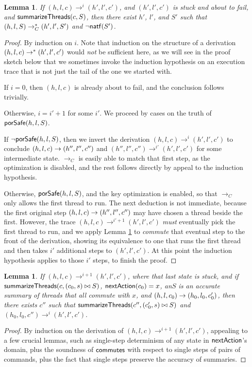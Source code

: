 \documentclass{amsbook}
\newtheorem{lemma}[theorem]{Lemma}
\theoremstyle{definition}
\theoremstyle{remark}
\numberwithin{section}{chapter}
\numberwithin{equation}{chapter}
\begin{document}
\begin{lemma}\label{translate_trace}
  If $(h, l, c) \to^i (h', l', c')$, and $(h', l', c')$ is stuck and about to fail, and $\mathsf{summarizeThreads}(c, S)$, then there exist $h'$, $l'$, and $S'$ such that $(h, l, S) \to_C^* (h', l', S')$ and $\neg \mathsf{natf}(S')$.
\end{lemma}
\begin{proof}
  By induction on $i$.
  Note that induction on the structure of a derivation $(h, l, c) \to^* (h', l', c')$ would \emph{not} be sufficient here, as we will see in the proof sketch below that we sometimes invoke the induction hypothesis on an execution trace that is not just the tail of the one we started with.

  If $i = 0$, then $(h, l, c)$ is already about to fail, and the conclusion follows trivially.

  Otherwise, $i = i' + 1$ for some $i'$.
  We proceed by cases on the truth of $\mathsf{porSafe}(h, l, S)$.

  If $\neg \mathsf{porSafe}(h, l, S)$, then we invert the derivation $(h, l, c) \to^i (h', l', c')$ to conclude $(h, l, c) \to (h'', l'', c'')$ and $(h'', l'', c'') \to^{i'} (h', l', c')$ for some intermediate state.
  $\to_C$ is easily able to match that first step, as the optimization is disabled, and the rest follows directly by appeal to the induction hypothesis.

  Otherwise, $\mathsf{porSafe}(h, l, S)$, and the key optimization is enabled, so that $\to_C$ only allows the first thread to run.
  The next deduction is not immediate, because the first original step $(h, l, c) \to (h'', l'', c'')$ may have chosen a thread beside the first.
  However, the trace $(h, l, c) \to^{i'+1} (h', l', c')$ \emph{must} eventually pick the first thread to run, and we apply Lemma \ref{translate_trace_commute} to \emph{commute} that eventual step to the front of the derivation, showing its equivalence to one that runs the first thread and then takes $i'$ additional steps to $(h', l', c')$.
  At this point the induction hypothesis applies to those $i'$ steps, to finish the proof.
\end{proof}

\begin{lemma}\label{translate_trace_commute}
  If $(h, l, c) \to^{i+1} (h', l', c')$, where that last state is stuck, and if $\mathsf{summarizeThreads}(c, (c_0, s) \bowtie S)$, $\mathsf{nextAction}(c_0) = x$, an$S$ is an accurate summary of threads that all commute with $x$, and $(h, l, c_0) \to (h_0, l_0, c'_0)$, then there exists $c''$ such that $\mathsf{summarizeThreads}(c'', (c'_0, s) \bowtie S)$ and $(h_0, l_0, c'') \to^i (h', l', c')$.
\end{lemma}
\begin{proof}
  By induction on the derivation of $(h, l, c) \to^{i+1} (h', l', c')$, appealing to a few crucial lemmas, such as single-step determinism of any state in $\mathsf{nextAction}$'s domain, plus the soundness of $\mathsf{commutes}$ with respect to single steps of pairs of commands, plus the fact that single steps preserve the accuracy of summaries.
\end{proof}
\end{document}
